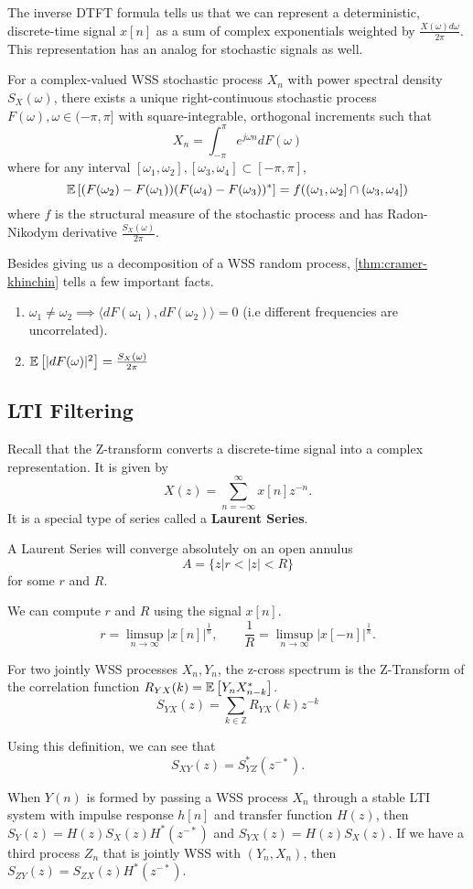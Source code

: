 The inverse DTFT formula tells us that we can represent a deterministic, discrete-time signal $x[n]$ as a sum of complex exponentials weighted by $\frac{X(\omega)d\omega}{2\pi}$.
This representation has an analog for stochastic signals as well.
\begin{theorem}
	For a complex-valued WSS stochastic process $X_n$ with power spectral density $S_X(\omega)$, there exists a unique right-continuous stochastic process $F(\omega), \omega\in(-\pi,\pi]$ with square-integrable, orthogonal increments such that \[
		X_n = \int_{-\pi}^{\pi}e^{j\omega n}dF(\omega)
	\] where for any interval $[\omega_1,\omega_2], [\omega_3, \omega_4]\subset [-\pi,\pi]$, \[
		\mathbb{E}\left[(F(\omega_2)-F(\omega_1))(F(\omega_4) - F(\omega_3))^*\right] = f((\omega_1,\omega_2] \cap (\omega_3, \omega_4])
	\] where $f$ is the structural measure of the stochastic process and has Radon-Nikodym derivative $\frac{S_X(\omega)}{2\pi}$.
	\label{thm:cramer-khinchin}
\end{theorem}
Besides giving us a decomposition of a WSS random process, \cref{thm:cramer-khinchin} tells a few important facts.
\begin{enumerate}
	\item $\omega_1\neq\omega_2 \implies \langle dF(\omega_1), dF(\omega_2) \rangle = 0$ (i.e different frequencies are uncorrelated).
	\item $\mathbb{E}\left[|dF(\omega)|^2\right] = \frac{S_X(\omega)}{2\pi}$
\end{enumerate}
\subsection{LTI Filtering}
Recall that the Z-transform converts a discrete-time signal into a complex representation.
It is given by \[
	X(z) = \sum_{n=-\infty}^{\infty}x[n]z^{-n}.
\]
It is a special type of series called a \textbf{Laurent Series}.
\begin{theorem}
	A Laurent Series will converge absolutely on an open annulus \[
		A = \{z | r < |z| < R \}
	\] for some $r$ and $R$.
	\label{thm:z-transform-roc}
\end{theorem}
We can compute $r$ and $R$ using the signal $x[n]$.
\[
	r = \limsup_{n\to\infty} |x[n]|^{\frac{1}{n}}, \qquad \frac{1}{R} = \limsup_{n\to\infty}|x[-n]|^{\frac{1}{n}}.
\]
\begin{definition}
	For two jointly WSS processes $X_n, Y_n$, the z-cross spectrum is the Z-Transform of the correlation function $R_{YX}(k) = \mathbb{E}\left[Y_nX^*_{n-k}\right]$.
	\[
		S_{YX}(z) = \sum_{k\in\mathbb{Z}}R_{YX}(k)z^{-k}
	\]
	\label{defn:z-cross-spectrum}
\end{definition}
Using this definition, we can see that \[
	S_{XY}(z) = S^*_{YZ}(z^{-*}).
\]
\begin{theorem}
	When $Y(n)$ is formed by passing a WSS process $X_n$ through a stable LTI system with impulse response $h[n]$ and transfer function $H(z)$, then $S_Y(z) = H(z)S_X(z)H^*(z^{-*})$ and $S_{YX}(z) = H(z)S_X(z)$.
	If we have a third process $Z_n$ that is jointly WSS with $(Y_n, X_n)$, then $S_{ZY}(z) = S_{ZX}(z)H^*(z^{-*})$.
	\label{thm:lti-process}
\end{theorem}
